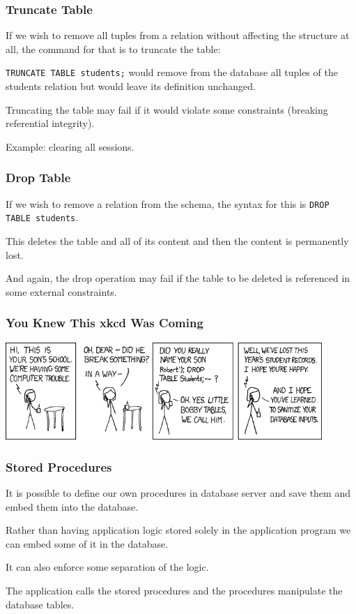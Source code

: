\begin{frame}
\frametitle{Truncate Table}

If we wish to remove all tuples from a relation without affecting the structure at all, the command for that is to truncate the table: 

\texttt{TRUNCATE TABLE students;} would remove from the database all tuples of the students relation but would leave its definition unchanged. 

Truncating the table may fail if it would violate some constraints (breaking referential integrity).

Example: clearing all sessions.

\end{frame}

\begin{frame}
\frametitle{Drop Table}
If we wish to remove a relation from the schema, the syntax for this is \texttt{DROP TABLE students}. 

This deletes the table and all of its content and then the content is permanently lost. 

And again, the drop operation may fail if the table to be deleted is referenced in some external constraints.
\end{frame}


\begin{frame}
\frametitle{You Knew This xkcd Was Coming}

\begin{center}
\includegraphics[width=0.9\textwidth]{images/exploits_of_a_mom}
\end{center}

\end{frame}


\begin{frame}
\frametitle{Stored Procedures}

It is possible to define our own procedures in database server and save them and embed them into the database. 

Rather than having application logic stored solely in the application program we can embed some of it in the database. 

It can also enforce some separation of the logic.

The application calls the stored procedures and the procedures manipulate the database tables.


\end{frame}


